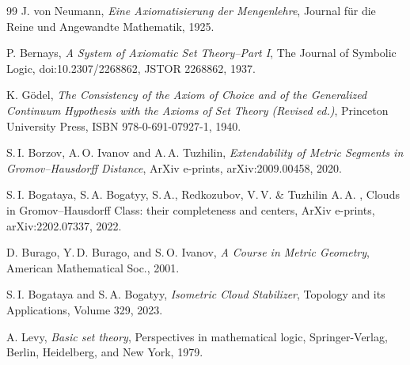 \documentclass[leqno]{article}
\begin{document}
\begin{thebibliography}{99}
    J. von Neumann, \emph{Eine Axiomatisierung der Mengenlehre},
    Journal f\"ur die Reine und Angewandte Mathematik, 1925.

    P. Bernays, \emph{A System of Axiomatic Set Theory--Part I}, The
    Journal of Symbolic Logic, doi:10.2307/2268862, JSTOR 2268862, 1937.

    K. G\"odel, \emph{The Consistency of the Axiom of Choice and of the
        Generalized Continuum Hypothesis with the Axioms of Set Theory
    (Revised ed.)}, Princeton University Press,  ISBN 978-0-691-07927-1, 1940.

    S.\,I. Borzov, A.\,O. Ivanov and A.\,A. Tuzhilin,
    \emph{Extendability of Metric Segments in Gromov--Hausdorff
    Distance}, ArXiv e-prints, arXiv:2009.00458, 2020.

    S.\,I. Bogataya, S.\,A. Bogatyy, S.\,A., Redkozubov, V.\,V. \&
    Tuzhilin A.\,A. , Clouds in Gromov--Hausdorff Class: their
    completeness and centers, ArXiv e-prints, arXiv:2202.07337, 2022.

    D. Burago, Y.\,D. Burago, and S.\,O. Ivanov, \emph{A Course in
    Metric Geometry}, American Mathematical Soc., 2001.

    S.\,I. Bogataya and S.\,A. Bogatyy, \emph{Isometric Cloud
    Stabilizer}, Topology and its Applications, Volume 329, 2023.

    A. Levy, \emph{Basic set theory}, Perspectives in
    mathematical logic, Springer-Verlag, Berlin, Heidelberg, and New York, 1979.

\end{thebibliography}
\end{document}
